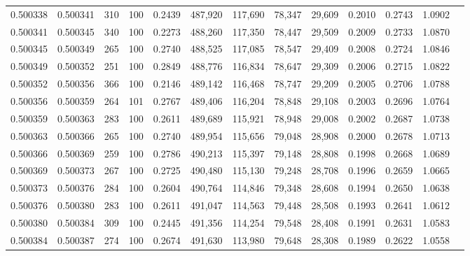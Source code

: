 \begin{tabular}{rrrrrrrrrrrrr}
0.500338 & 0.500341 &   310 & 100 &                                     0.2439 & 487,920 & 117,690 &  78,347 &  29,609 & 0.2010 & 0.2743 & 1.0902 \\
0.500341 & 0.500345 &   340 & 100 &                                     0.2273 & 488,260 & 117,350 &  78,447 &  29,509 & 0.2009 & 0.2733 & 1.0870 \\
0.500345 & 0.500349 &   265 & 100 &                                     0.2740 & 488,525 & 117,085 &  78,547 &  29,409 & 0.2008 & 0.2724 & 1.0846 \\
0.500349 & 0.500352 &   251 & 100 &                                     0.2849 & 488,776 & 116,834 &  78,647 &  29,309 & 0.2006 & 0.2715 & 1.0822 \\
0.500352 & 0.500356 &   366 & 100 &                                     0.2146 & 489,142 & 116,468 &  78,747 &  29,209 & 0.2005 & 0.2706 & 1.0788 \\
0.500356 & 0.500359 &   264 & 101 &                                     0.2767 & 489,406 & 116,204 &  78,848 &  29,108 & 0.2003 & 0.2696 & 1.0764 \\
0.500359 & 0.500363 &   283 & 100 &                                     0.2611 & 489,689 & 115,921 &  78,948 &  29,008 & 0.2002 & 0.2687 & 1.0738 \\
0.500363 & 0.500366 &   265 & 100 &                                     0.2740 & 489,954 & 115,656 &  79,048 &  28,908 & 0.2000 & 0.2678 & 1.0713 \\
0.500366 & 0.500369 &   259 & 100 &                                     0.2786 & 490,213 & 115,397 &  79,148 &  28,808 & 0.1998 & 0.2668 & 1.0689 \\
0.500369 & 0.500373 &   267 & 100 &                                     0.2725 & 490,480 & 115,130 &  79,248 &  28,708 & 0.1996 & 0.2659 & 1.0665 \\
0.500373 & 0.500376 &   284 & 100 &                                     0.2604 & 490,764 & 114,846 &  79,348 &  28,608 & 0.1994 & 0.2650 & 1.0638 \\
0.500376 & 0.500380 &   283 & 100 &                                     0.2611 & 491,047 & 114,563 &  79,448 &  28,508 & 0.1993 & 0.2641 & 1.0612 \\
0.500380 & 0.500384 &   309 & 100 &                                     0.2445 & 491,356 & 114,254 &  79,548 &  28,408 & 0.1991 & 0.2631 & 1.0583 \\
0.500384 & 0.500387 &   274 & 100 &                                     0.2674 & 491,630 & 113,980 &  79,648 &  28,308 & 0.1989 & 0.2622 & 1.0558 \\

\end{tabular}
